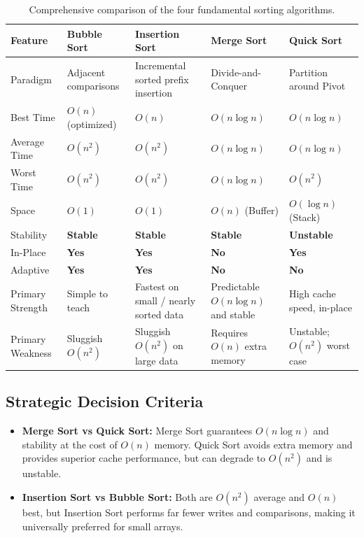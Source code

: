 \begin{table}[htbp]
\centering
\footnotesize
\begin{tabularx}{\textwidth}{p{2.6cm} X X X X}
\toprule
\textbf{Feature} & \textbf{Bubble Sort} & \textbf{Insertion Sort} & \textbf{Merge Sort} & \textbf{Quick Sort} \\
\midrule
Paradigm & Adjacent comparisons & Incremental sorted prefix insertion & Divide-and-Conquer & Partition around Pivot \\
Best Time & $O(n)$ (optimized) & $O(n)$ & $O(n \log n)$ & $O(n \log n)$ \\
Average Time & $O(n^2)$ & $O(n^2)$ & $O(n \log n)$ & $O(n \log n)$ \\
Worst Time & $O(n^2)$ & $O(n^2)$ & $O(n \log n)$ & $O(n^2)$ \\
Space & $O(1)$ & $O(1)$ & $O(n)$ (Buffer) & $O(\log n)$ (Stack) \\
Stability & \textbf{Stable} & \textbf{Stable} & \textbf{Stable} & \textbf{Unstable} \\
In-Place & \textbf{Yes} & \textbf{Yes} & \textbf{No} & \textbf{Yes} \\
Adaptive & \textbf{Yes} & \textbf{Yes} & \textbf{No} & \textbf{No} \\
Primary Strength & Simple to teach & Fastest on small / nearly sorted data & Predictable $O(n \log n)$ and stable & High cache speed, in-place \\
Primary Weakness & Sluggish $O(n^2)$ & Sluggish $O(n^2)$ on large data & Requires $O(n)$ extra memory & Unstable; $O(n^2)$ worst case \\
\bottomrule
\end{tabularx}
\caption{Comprehensive comparison of the four fundamental sorting algorithms.}
\end{table}

\subsection{Strategic Decision Criteria}
\begin{itemize}
    \item \textbf{Merge Sort vs Quick Sort:} Merge Sort guarantees $O(n \log n)$ and stability at the cost of $O(n)$ memory. Quick Sort avoids extra memory and provides superior cache performance, but can degrade to $O(n^2)$ and is unstable.
    \item \textbf{Insertion Sort vs Bubble Sort:} Both are $O(n^2)$ average and $O(n)$ best, but Insertion Sort performs far fewer writes and comparisons, making it universally preferred for small arrays.
\end{itemize}

